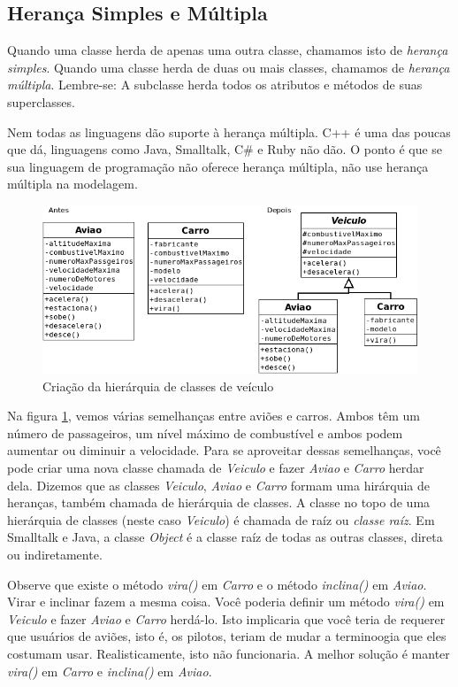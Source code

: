 \documentclass[
	article,			%
	12pt,				%
	openright,
	twoside,			%
	a4paper,			%
	english,			%
	french,
	brazil,				%
	sumario=tradicional
	]{abntex2}
\begin{document}
\subsection{Herança Simples e Múltipla}

Quando uma classe herda de apenas uma outra classe, chamamos isto de \emph{herança simples}. Quando uma classe herda de duas ou mais classes, chamamos de \emph{herança múltipla}. Lembre-se: A subclasse herda todos os atributos e métodos de suas superclasses.

Nem todas as linguagens dão suporte à herança múltipla. C++ é uma das poucas que dá, linguagens como Java, Smalltalk, C\# e Ruby não dão. O ponto é que se sua linguagem de programação não oferece herança múltipla, não use herança múltipla na modelagem.

\begin{figure}[h]
\begin{center}
\includegraphics[scale=0.6]{uml3.png} 
\caption{Criação da hierárquia de classes de veículo} \label{fig:uml3}
\end{center}
\end{figure}

Na figura \ref{fig:uml3}, vemos várias semelhanças entre aviões e carros. Ambos têm um número de passageiros, um nível máximo de combustível e ambos podem aumentar ou diminuir a velocidade. Para se aproveitar dessas semelhanças, você pode criar uma nova classe chamada de \emph{Veiculo} e fazer \emph{Aviao} e \emph{Carro} herdar dela. Dizemos que as classes \emph{Veiculo}, \emph{Aviao} e \emph{Carro} formam uma hirárquia de heranças, também chamada de hierárquia de classes. A classe no topo de uma hierárquia de classes (neste caso \emph{Veiculo}) é chamada de raíz ou \emph{classe raíz}. Em Smalltalk e Java, a classe \emph{Object} é a classe raíz de todas as outras classes, direta ou indiretamente.

Observe que existe o método \emph{vira()} em \emph{Carro} e o método \emph{inclina()} em \emph{Aviao}. Virar e inclinar fazem a mesma coisa. Você poderia definir um método \emph{vira()} em \emph{Veiculo} e fazer \emph{Aviao} e \emph{Carro} herdá-lo. Isto implicaria que você teria de requerer que usuários de aviões, isto é, os pilotos, teriam de mudar a terminoogia que eles costumam usar. Realisticamente, isto não funcionaria. A melhor solução é manter \emph{vira()} em \emph{Carro} e \emph{inclina()} em \emph{Aviao}.
\end{document}
